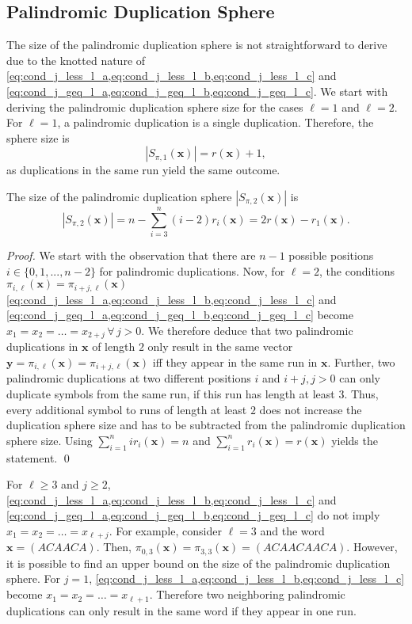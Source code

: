 \documentclass[a4paper]{llncs}
\newcommand{\ve}[1]{\boldsymbol{#1}}
\begin{document}
	\subsection{Palindromic Duplication Sphere}
	The size of the palindromic duplication sphere is not straightforward to derive due to the knotted nature of \cref{eq:cond_j_less_l_a,eq:cond_j_less_l_b,eq:cond_j_less_l_c} and \cref{eq:cond_j_geq_l_a,eq:cond_j_geq_l_b,eq:cond_j_geq_l_c}. We start with deriving the palindromic duplication sphere size for the cases $\ell=1$ and $\ell=2$. For $\ell=1$, a palindromic duplication is a single duplication. Therefore, the sphere size is
	\begin{equation}
	|S_{\pi,1}(\ve{x})| = r(\ve{x})+1,
	\end{equation}
	as duplications in the same run yield the same outcome.
	\begin{lemma}\label{lemma:palindromic_duplication_sphere_l_2}The size of the palindromic duplication sphere $|S_{\pi, 2}(\ve{x})|$ is
		\begin{equation}
		|S_{\pi, 2}(\ve{x})| = n - \sum_{i=3}^n (i-2) r_i(\ve{x}) = 2 r(\boldsymbol{x}) - r_1(\boldsymbol{x}).
		\end{equation}
	\end{lemma}
	\begin{proof}
		We start with the observation that there are $n-1$ possible positions $i \in \{0,1, ..., n-2\}$ for palindromic duplications. Now, for $\ell=2$, the conditions $\pi_{i,\ell}(\ve{x}) = \pi_{i+j,\ell}(\ve{x})$ \cref{eq:cond_j_less_l_a,eq:cond_j_less_l_b,eq:cond_j_less_l_c} and \cref{eq:cond_j_geq_l_a,eq:cond_j_geq_l_b,eq:cond_j_geq_l_c} become  $x_1 = x_2 = \dots = x_{2+j} \, \forall \, j>0$. We therefore deduce that two palindromic duplications in $\ve{x}$ of length $2$ only result in the same vector $\boldsymbol{y}=\pi_{i,\ell}(\ve{x}) = \pi_{i+j,\ell}(\ve{x})$ iff they appear in the same run in $\ve{x}$. Further, two palindromic duplications at two different positions $i$ and $i+j, j>0$ can only duplicate symbols from the same run, if this run has length at least $3$. Thus, every additional symbol to runs of length at least $2$ does not increase the duplication sphere size and has to be subtracted from the palindromic duplication sphere size. Using $\sum_{i=1}^n i r_i(\ve{x}) = n$ and $\sum_{i=1}^n r_i(\ve{x}) = r(\ve{x})$ yields the statement. \qed
	\end{proof}
	For $\ell \geq 3$ and $j \geq 2$, \cref{eq:cond_j_less_l_a,eq:cond_j_less_l_b,eq:cond_j_less_l_c} and \cref{eq:cond_j_geq_l_a,eq:cond_j_geq_l_b,eq:cond_j_geq_l_c} do not imply $x_1=x_2 = \dots =x_{\ell+j}$. For example, consider $\ell=3$ and the word $\ve{x} = (ACAACA)$. Then, $\pi_{0,3}(\ve{x}) = \pi_{3,3}(\ve{x}) = (ACAACAACA)$. However, it is possible to find an upper bound on the size of the palindromic duplication sphere. For $j = 1$, \cref{eq:cond_j_less_l_a,eq:cond_j_less_l_b,eq:cond_j_less_l_c} become $x_1 = x_2 = \dots = x_{\ell+1}$. Therefore two neighboring palindromic duplications can only result in the same word if they appear in one run.
\end{document}
